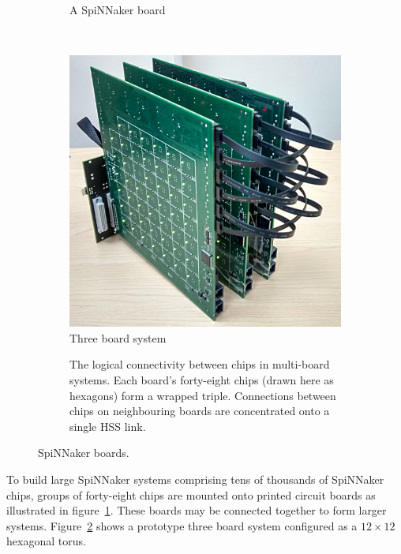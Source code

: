 \begin{figure}
\begin{subfigure}[b]{0.45\linewidth}
				\caption{A SpiNNaker board}
				\label{fig:spinnakerBoard}
			\end{subfigure}
			~~~
			\begin{subfigure}[b]{0.45\linewidth}
				\center
				\includegraphics[width=\linewidth]{figures/threeboard.jpg}
				
				\caption{Three board system}
				\label{fig:threeboard}
			\end{subfigure}
			
			\vspace*{2em}
			
			\begin{subfigure}{\linewidth}
				\center
				
				\caption{The logical connectivity between chips in multi-board systems.
				Each board's forty-eight chips (drawn here as hexagons) form a wrapped
				triple. Connections between chips on neighbouring boards are
				concentrated onto a single HSS link.}
				\label{fig:sata-connections} \end{subfigure}
			
			\caption{SpiNNaker boards.}
			\label{fig:spinnaker-boards}
		\end{figure}
		
		To build large SpiNNaker systems comprising tens of thousands of
		SpiNNaker chips, groups of forty-eight chips are mounted onto printed
		circuit boards as illustrated in figure~\ref{fig:spinnakerBoard}. These
		boards may be connected together to form larger systems.
		Figure~\ref{fig:threeboard} shows a prototype three board system configured
		as a $12\times12$ hexagonal torus.
		
